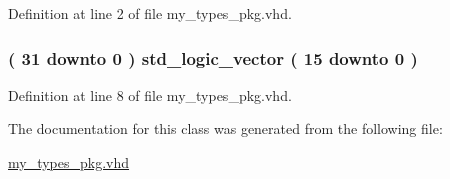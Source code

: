 Definition at line 2 of file my\+\_\+types\+\_\+pkg.\+vhd.

\hypertarget{classmy__types__pkg_a21a5e431ab9f6b463a95edab9bc10c40}{}
\subsubsection[{W\+O\+R\+D\+\_\+\+A\+R\+R\+A\+Y}]{ {\bfseries \textcolor{vhdlchar}{(}\textcolor{vhdlchar}{ }\textcolor{vhdlchar}{ } \textcolor{vhdldigit}{31} \textcolor{vhdlchar}{ }\textcolor{keywordflow}{downto}\textcolor{vhdlchar}{ }\textcolor{vhdlchar}{ } \textcolor{vhdldigit}{0} \textcolor{vhdlchar}{ }\textcolor{vhdlchar}{)}\textcolor{vhdlchar}{ }\textcolor{vhdlchar}{ }\textcolor{comment}{std\+\_\+logic\+\_\+vector}\textcolor{vhdlchar}{ }\textcolor{vhdlchar}{(}\textcolor{vhdlchar}{ }\textcolor{vhdlchar}{ } \textcolor{vhdldigit}{15} \textcolor{vhdlchar}{ }\textcolor{keywordflow}{downto}\textcolor{vhdlchar}{ }\textcolor{vhdlchar}{ } \textcolor{vhdldigit}{0} \textcolor{vhdlchar}{ }\textcolor{vhdlchar}{)}\textcolor{vhdlchar}{ }} \hspace{0.3cm}{\ttfamily [Type]}}\label{classmy__types__pkg_a21a5e431ab9f6b463a95edab9bc10c40}


Definition at line 8 of file my\+\_\+types\+\_\+pkg.\+vhd.



The documentation for this class was generated from the following file\+:\begin{DoxyCompactItemize}
\item 
\hyperlink{my__types__pkg_8vhd}{my\+\_\+types\+\_\+pkg.\+vhd}\end{DoxyCompactItemize}
